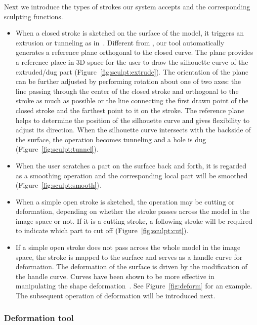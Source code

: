 Next we introduce the types of strokes our system accepts and
the corresponding sculpting functions.

\begin{itemize}
\item When a closed stroke is sketched on the
surface of the model, it triggers an extrusion or tunneling as
in~\cite{IMT99,NISA07}. Different from \cite{IMT99,NISA07}, our tool
automatically generates a reference plane orthogonal to the closed
curve. The plane provides a reference place in 3D space for the user
to draw the silhouette curve of the extruded/dug part
(Figure~\ref{fig:sculpt:extrude}). The orientation of the plane can
be further adjusted by performing rotation about one of two axes:
the line passing through the center of the closed stroke and
orthogonal to the stroke as much as possible or the line connecting
the first drawn point of the closed stroke and the farthest point to
it on the stroke. The reference plane helps to determine the
position of the silhouette curve and gives flexibility to adjust its
direction. When the silhouette curve intersects with the backside of
the surface, the operation becomes tunneling and a hole is dug
(Figure~\ref{fig:sculpt:tunnel}).

\item When the user scratches a part on the surface back and forth, it
is regarded as a smoothing operation and the corresponding local
part will be smoothed (Figure~\ref{fig:sculpt:smooth}).


\item When a simple open stroke is sketched, the operation may be
cutting or deformation, depending on whether the stroke passes
across the model in the image space or not. If it is a cutting
stroke, a following stroke will be required to indicate which part
to cut off (Figure~\ref{fig:sculpt:cut}).

\item If a simple open stroke does not pass across the whole model in the image space,
the stroke is mapped to the surface and serves as a handle curve for
deformation. The deformation of the surface is driven by the
modification of the handle curve. Curves have been shown to be more
effective in manipulating the shape deformation~\cite{NISA07}. See
Figure~\ref{fig:deform} for an example. The subsequent
operation of deformation will be introduced next.
\end{itemize}



\subsubsection{Deformation tool}
\label{ch3:sec:ui:sculpt:deform}

